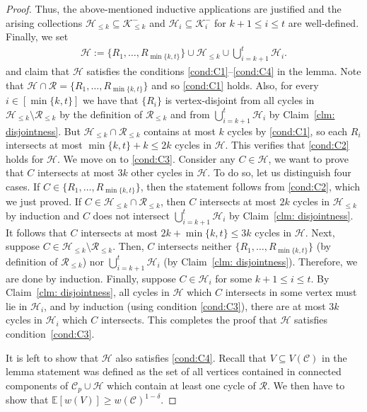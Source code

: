 \documentclass[11pt,reqno]{article}
\begin{document}
\begin{proof}
   Thus, the above-mentioned inductive applications are justified and the arising collections $\mathcal{H}_{\le k}\subseteq \mathcal{K}_{\le k}^-$ and $\mathcal{H}_i\subseteq \mathcal{K}_i^-$ for $k+1\le i\le t$ are well-defined. Finally, we set\begin{align*}
        \mathcal H := \{R_1,\ldots,R_{\min\{k,t\}}\}\cup \mathcal H_{\leq k}\cup \bigcup_{i=k+1}^t\mathcal H_i.
    \end{align*}
     and claim that $\mathcal H$ satisfies the conditions \ref{cond:C1}--\ref{cond:C4} in the lemma. Note that $\mathcal{H}\cap \mathcal{R}=\{R_1,\ldots,R_{\min\{k,t\}}\}$ and so \ref{cond:C1} holds. Also, for every $i\in [\min\{k,t\}]$ we have that $\{R_i\}$ is vertex-disjoint from all cycles in $\mathcal H_{\leq k}\setminus \mathcal R_{\leq k}$ by the definition of $\mathcal R_{\leq k}$ and from $\bigcup_{i=k+1}^t\mathcal H_i$ by Claim~\ref{clm: disjointness}. But $\mathcal H_{\leq k}\cap \mathcal R_{\leq k}$ contains at most $k$ cycles by \ref{cond:C1}, so each $R_i$ intersects at most $\min\{k,t\}+k\le 2k$ cycles in $\mathcal{H}$. This verifies that \ref{cond:C2} holds for $\mathcal{H}$. We move on to \ref{cond:C3}. Consider any $C\in\mathcal H$, we want to prove that $C$ intersects at most $3k$ other cycles in $\mathcal{H}$. To do so, let us distinguish four cases. If $C\in\{R_1,\ldots,R_{\min\{k,t\}}\}$, then the statement follows from \ref{cond:C2}, which we just proved. If $C\in \mathcal{H}_{\le k}\cap \mathcal R_{\leq k}$, then $C$ intersects at most $2k$ cycles in $\mathcal H_{\leq k}$ by induction and $C$ does not intersect $\bigcup_{i=k+1}^t\mathcal H_i$ by Claim~\ref{clm: disjointness}. It follows that $C$ intersects at most $2k+\min\{k,t\}\le 3k$ cycles in $\mathcal H$. Next, suppose $C\in \mathcal H_{\leq k}\setminus\mathcal R_{\leq k}$. Then, $C$ intersects neither $\{R_1,\ldots,R_{\min\{k,t\}}\}$ (by definition of $\mathcal R_{\leq k}$) nor $\bigcup_{i=k+1}^t\mathcal H_i$ (by Claim~\ref{clm: disjointness}). Therefore, we are done by induction. Finally, suppose $C\in \mathcal H_i$ for some $k+1\leq i\leq t$. By Claim~\ref{clm: disjointness}, all cycles in $\mathcal{H}$ which $C$ intersects in some vertex must lie in $\mathcal H_i$, and by induction (using condition \ref{cond:C3}), there are at most $3k$ cycles in $\mathcal{H}_i$ which $C$ intersects. This completes the proof that $\mathcal{H}$ satisfies condition~\ref{cond:C3}.

    It is left to show that $\mathcal{H}$ also satisfies \ref{cond:C4}. 
    Recall that $V\subseteq V(\mathcal C)$ in the lemma statement was defined as the set of all vertices contained in connected components of $\mathcal C_p\cup \mathcal H$ which contain at least one cycle of $\mathcal{R}$. We then have to show that $\mathbb{E}[w(V)]\ge w(\mathcal C)^{1-\delta}$. 


\end{proof}
\end{document}
